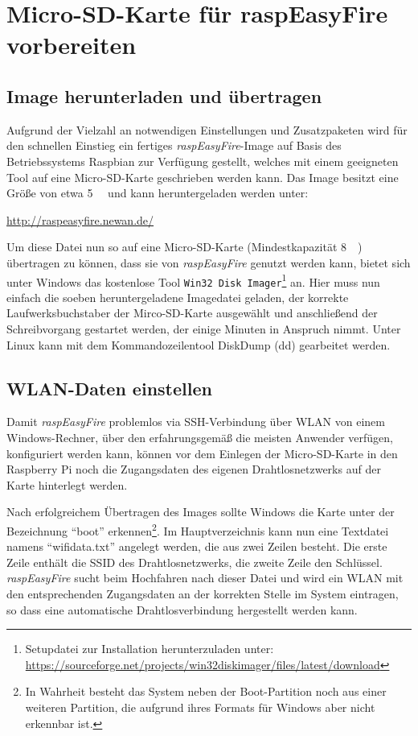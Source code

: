\documentclass[paper=a4, parskip, numbers=noenddot, toc=listof, headsepline]{scrbook}
\newcommand{\REF}{\emph{raspEasyFire}}
\begin{document}
	\chapter{Micro-SD-Karte für raspEasyFire vorbereiten}
		\label{ch:raspisd}

		\section{Image herunterladen und übertragen}
			Aufgrund der Vielzahl an notwendigen Einstellungen und Zusatzpaketen wird für den schnellen Einstieg ein fertiges {\REF}-Image auf Basis des Betriebssystems Raspbian zur Verfügung gestellt, welches mit einem geeigneten Tool auf eine Micro-SD-Karte geschrieben werden kann. Das Image besitzt eine Größe von etwa \SI{5}{\giga\byte} und kann heruntergeladen werden unter:
			\begin{center}
				\url{http://raspeasyfire.newan.de/}
			\end{center}

			Um diese Datei nun so auf eine Micro-SD-Karte (Mindestkapazität \SI{8}{\giga\byte}) übertragen zu können, dass sie von {\REF} genutzt werden kann, bietet sich unter Windows das kostenlose Tool \texttt{Win32 Disk Imager}\footnote{Setupdatei zur Installation herunterzuladen unter: \url{https://sourceforge.net/projects/win32diskimager/files/latest/download}} an. Hier muss nun einfach die soeben heruntergeladene Imagedatei geladen, der korrekte Laufwerksbuchstaber der Mirco-SD-Karte ausgewählt und anschließend der Schreibvorgang gestartet werden, der einige Minuten in Anspruch nimmt. Unter Linux kann mit dem Kommandozeilentool DiskDump (dd) gearbeitet werden.

		\section{WLAN-Daten einstellen}

			Damit {\REF} problemlos via SSH-Verbindung über WLAN von einem Windows-Rechner, über den erfahrungsgemäß die meisten Anwender verfügen, konfiguriert werden kann, können vor dem Einlegen der Micro-SD-Karte in den Raspberry Pi noch die Zugangsdaten des eigenen Drahtlosnetzwerks auf der Karte hinterlegt werden.

			Nach erfolgreichem Übertragen des Images sollte Windows die Karte unter der Bezeichnung \enquote{boot} erkennen\footnote{In Wahrheit besteht das System neben der Boot-Partition noch aus einer weiteren Partition, die aufgrund ihres Formats für Windows aber nicht erkennbar ist.}. Im Hauptverzeichnis kann nun eine Textdatei namens \enquote{wifidata.txt} angelegt werden, die aus zwei Zeilen besteht. Die erste Zeile enthält die SSID des Drahtlosnetzwerks, die zweite Zeile den Schlüssel. {\REF} sucht beim Hochfahren nach dieser Datei und wird ein WLAN mit den entsprechenden Zugangsdaten an der korrekten Stelle im System eintragen, so dass eine automatische Drahtlosverbindung hergestellt werden kann.
\end{document}
